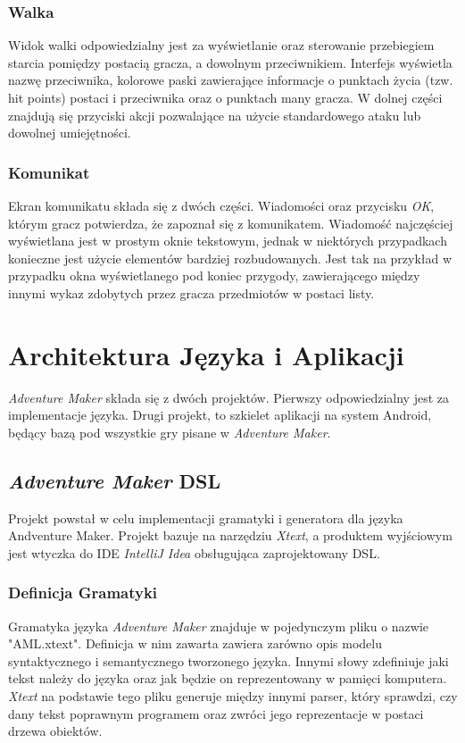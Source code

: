 \documentclass[openright]{xmgr}
\begin{document}
\subsection*{Walka}
Widok walki odpowiedzialny jest za wyświetlanie oraz sterowanie przebiegiem starcia pomiędzy postacią gracza, a dowolnym przeciwnikiem. Interfejs wyświetla nazwę przeciwnika, kolorowe paski zawierające informacje o punktach życia (tzw. hit points) postaci i przeciwnika oraz o punktach many gracza. W dolnej części znajdują się przyciski akcji pozwalające na użycie standardowego ataku lub dowolnej umiejętności.
\subsection*{Komunikat}
Ekran komunikatu składa się z dwóch części. Wiadomości oraz przycisku \textit{OK}, którym gracz potwierdza, że zapoznał się z komunikatem. Wiadomość najczęściej wyświetlana jest w prostym oknie tekstowym, jednak w niektórych przypadkach konieczne jest użycie elementów bardziej rozbudowanych. Jest tak na przykład w przypadku okna wyświetlanego pod koniec przygody, zawierającego między innymi wykaz zdobytych przez gracza przedmiotów w postaci listy.

\chapter{Architektura Języka i Aplikacji}

\textit{Adventure Maker} składa się z dwóch projektów. Pierwszy odpowiedzialny jest za implementacje języka. Drugi projekt, to szkielet aplikacji na system Android, będący bazą pod wszystkie gry pisane w \textit{Adventure Maker}. 

\section{\textit{Adventure Maker} DSL} 
Projekt powstał w celu implementacji gramatyki i generatora dla języka Andventure Maker. Projekt bazuje na narzędziu \textit{Xtext}\cite{Xtext:2017:Doc}, a produktem wyjściowym jest wtyczka do IDE \textit{IntelliJ Idea} obsługująca zaprojektowany DSL. 

\subsection{Definicja Gramatyki} 

Gramatyka języka \textit{Adventure Maker} znajduje w pojedynczym pliku o nazwie "AML.xtext". Definicja w nim zawarta zawiera zarówno opis modelu syntaktycznego i semantycznego tworzonego języka. Innymi słowy zdefiniuje jaki tekst należy do języka oraz jak będzie on reprezentowany w pamięci komputera. \textit{Xtext} na podstawie tego pliku generuje między innymi parser, który sprawdzi, czy dany tekst poprawnym programem oraz zwróci jego reprezentacje w postaci drzewa obiektów.
\end{document}
